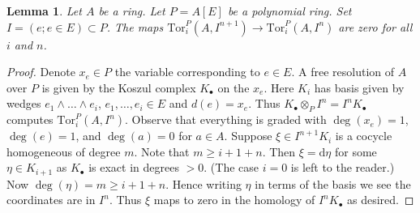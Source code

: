 \documentclass[10pt,a4paper]{amsart}
\theoremstyle{plain}
\newtheorem{lemma}[subsection]{Lemma}
\theoremstyle{definition}
\theoremstyle{remark}
\numberwithin{equation}{subsection}
\begin{document}
\begin{lemma}
\label{lemma-map-tors-zero}
Let $A$ be a ring. Let $P = A[E]$ be a polynomial ring.
Set $I = (e; e \in E) \subset P$. The maps
$\text{Tor}_i^P(A, I^{n + 1}) \to \text{Tor}_i^P(A, I^n)$
are zero for all $i$ and $n$.
\end{lemma}

\begin{proof}
Denote $x_e \in P$ the variable corresponding to $e \in E$.
A free resolution of $A$ over $P$ is given by the Koszul complex
$K_\bullet$ on the $x_e$. Here $K_i$ has basis given by wedges
$e_1 \wedge \ldots \wedge e_i$, $e_1, \ldots, e_i \in E$ and $d(e) = x_e$.
Thus $K_\bullet \otimes_P I^n = I^nK_\bullet$ computes
$\text{Tor}_i^P(A, I^n)$. Observe that everything is graded
with $\deg(x_e) = 1$, $\deg(e) = 1$, and $\deg(a) = 0$ for $a \in A$.
Suppose $\xi \in I^{n + 1}K_i$ is a cocycle homogeneous of degree $m$.
Note that $m \geq i + 1 + n$. Then $\xi = \text{d}\eta$ for some
$\eta \in K_{i + 1}$ as $K_\bullet$ is exact in degrees $ > 0$.
(The case $i = 0$ is left to the reader.)
Now $\deg(\eta) = m \geq i + 1 + n$. Hence writing $\eta$
in terms of the basis we see the coordinates are in $I^n$.
Thus $\xi$ maps to zero in the homology of $I^nK_\bullet$ as desired.
\end{proof}
\end{document}
